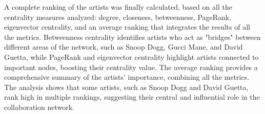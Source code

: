 A complete ranking of the artists was finally calculated, based on all the centrality measures analyzed: degree, closeness, betweenness, PageRank, eigenvector centrality, and an average ranking that integrates the results of all the metrics. Betweenness centrality identifies artists who act as "bridges" between different areas of the network, such as Snoop Dogg, Gucci Mane, and David Guetta, while PageRank and eigenvector centrality highlight artists connected to important nodes, boosting their centrality value. The average ranking provides a comprehensive summary of the artists' importance, combining all the metrics. The analysis shows that some artists, such as Snoop Dogg and David Guetta, rank high in multiple rankings, suggesting their central and influential role in the collaboration network.